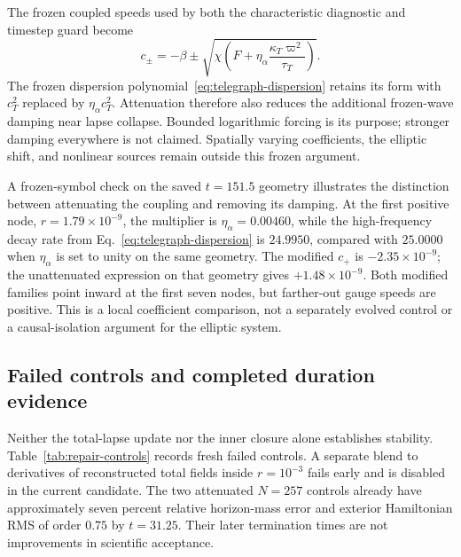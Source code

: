 The frozen coupled speeds used by both the characteristic diagnostic and timestep guard become
\begin{equation}
 c_\pm=-\beta\pm\sqrt{\chi\left(F+
 \eta_\alpha\frac{\kappa_T\varpi^2}{\tau_T}\right)}.
 \label{eq:attenuated-speeds}
\end{equation}
The frozen dispersion polynomial~\eqref{eq:telegraph-dispersion} retains its form with $c_T^2$ replaced by $\eta_\alpha c_T^2$. Attenuation therefore also reduces the additional frozen-wave damping near lapse collapse. Bounded logarithmic forcing is its purpose; stronger damping everywhere is not claimed. Spatially varying coefficients, the elliptic shift, and nonlinear sources remain outside this frozen argument.

A frozen-symbol check on the saved $t=151.5$ geometry illustrates the distinction between attenuating the coupling and removing its damping. At the first positive node, $r=1.79\times10^{-9}$, the multiplier is $\eta_\alpha=0.00460$, while the high-frequency decay rate from Eq.~\eqref{eq:telegraph-dispersion} is $24.9950$, compared with $25.0000$ when $\eta_\alpha$ is set to unity on the same geometry. The modified $c_+$ is $-2.35\times10^{-9}$; the unattenuated expression on that geometry gives $+1.48\times10^{-9}$. Both modified families point inward at the first seven nodes, but farther-out gauge speeds are positive. This is a local coefficient comparison, not a separately evolved control or a causal-isolation argument for the elliptic system.


\subsection{Failed controls and completed duration evidence}
\label{sec:tele-repair-evidence}
Neither the total-lapse update nor the inner closure alone establishes stability. Table~\ref{tab:repair-controls} records fresh failed controls. A separate blend to derivatives of reconstructed total fields inside $r=10^{-3}$ fails early and is disabled in the current candidate. The two attenuated $N=257$ controls already have approximately seven percent relative horizon-mass error and exterior Hamiltonian RMS of order $0.75$ by $t=31.25$. Their later termination times are not improvements in scientific acceptance.

